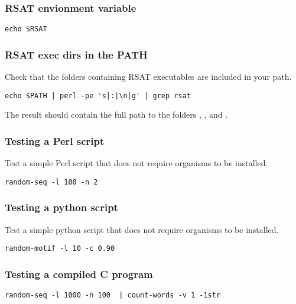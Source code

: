 \documentclass[12pt,a4paper, oneside]{scrreprt} %
\begin{document}
\subsubsection{RSAT envionment variable}

\begin{lstlisting}
echo $RSAT
\end{lstlisting}

\subsubsection{RSAT exec dirs in the PATH}

Check that the folders containing RSAT executables are included in
your path.

\begin{lstlisting}
echo $PATH | perl -pe 's|:|\n|g' | grep rsat
\end{lstlisting}

The result should contain the full path to the folders ,
, and .

\subsubsection{Testing a \RSAT Perl script}

Test a simple Perl script that does not require organisms to be
installed.

\begin{lstlisting}
random-seq -l 100 -n 2
\end{lstlisting}

\subsubsection{Testing a \RSAT python script}

Test a simple python script that does not require organisms to be
installed.

\begin{lstlisting}
random-motif -l 10 -c 0.90
\end{lstlisting}

\subsubsection{Testing a compiled C program}

\begin{lstlisting}
random-seq -l 1000 -n 100  | count-words -v 1 -1str
\end{lstlisting}
\end{document}
